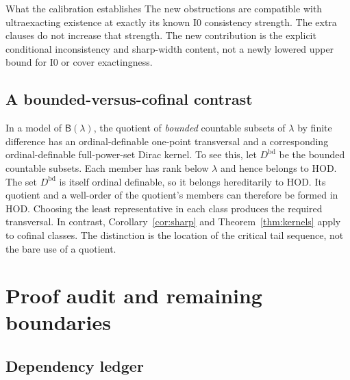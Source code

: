 \documentclass[11pt,letterpaper]{article}
\theoremstyle{definition}
\numberwithin{equation}{section}
\newcommand{\HOD}{\mathrm{HOD}}
\newcommand{\Izero}{\mathrm{I0}}
\begin{document}
\begin{assessment}{What the calibration establishes}
The new obstructions are compatible with ultraexacting existence at exactly its known $\Izero$ consistency strength. The extra clauses do not increase that strength. The new contribution is the explicit conditional inconsistency and sharp-width content, not a newly lowered upper bound for $\Izero$ or cover exactingness.
\end{assessment}

\subsection{A bounded-versus-cofinal contrast}

In a model of $\mathsf B(\lambda)$, the quotient of \emph{bounded} countable subsets of $\lambda$ by finite difference has an ordinal-definable one-point transversal and a corresponding ordinal-definable full-power-set Dirac kernel. To see this, let $D^{\mathrm{bd}}$ be the bounded countable subsets. Each member has rank below $\lambda$ and hence belongs to $\HOD$. The set $D^{\mathrm{bd}}$ is itself ordinal definable, so it belongs hereditarily to $\HOD$. Its quotient and a well-order of the quotient's members can therefore be formed in $\HOD$. Choosing the least representative in each class produces the required transversal. In contrast, Corollary~\ref{cor:sharp} and Theorem~\ref{thm:kernels} apply to cofinal classes. The distinction is the location of the critical tail sequence, not the bare use of a quotient.

\clearpage
\section{Proof audit and remaining boundaries}\label{sec:limits}

\subsection{Dependency ledger}
\end{document}

